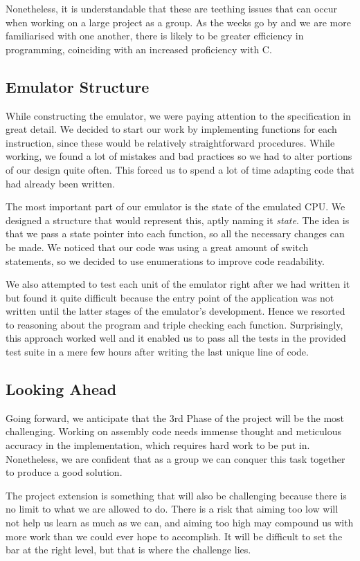 \documentclass[11pt]{article}
\begin{document}
Nonetheless, it is understandable that these are teething issues that can occur when working on a large project as a group. As the weeks go by and we are more familiarised with one another, there is likely to be greater efficiency in programming, coinciding with an increased proficiency with C.

\subsection*{Emulator Structure}
While constructing the emulator, we were paying attention to the specification in great detail. We decided to start our work by implementing functions for each instruction, since these would be relatively straightforward procedures. While working, we found a lot of mistakes and bad practices so we had to alter portions of our design quite often. This forced us to spend a lot of time adapting code that had already been written.

The most important part of our emulator is the state of the emulated CPU. We designed a structure that would represent this, aptly naming it \textit{state}. The idea is that we pass a state pointer into each function, so all the necessary changes can be made. We noticed that our code was using a great amount of switch statements, so we decided to use enumerations to improve code readability.

We also attempted to test each unit of the emulator right after we had written it but found it quite difficult because the entry point of the application was not written until the latter stages of the emulator's development. Hence we resorted to reasoning about the program and triple checking each function. Surprisingly, this approach worked well and it enabled us to pass all the tests in the provided test suite in a mere few hours after writing the last unique line of code.

\subsection*{Looking Ahead}
Going forward, we anticipate that the 3rd Phase of the project will be the most challenging. Working on assembly code needs immense thought and meticulous accuracy in the implementation, which requires hard work to be put in. Nonetheless, we are confident that as a group we can conquer this task together to produce a good solution.

The project extension is something that will also be challenging because there is no limit to what we are allowed to do. There is a risk that aiming too low will not help us learn as much as we can, and aiming too high may compound us with more work than we could ever hope to accomplish. It will be difficult to set the bar at the right level, but that is where the challenge lies.
\end{document}
